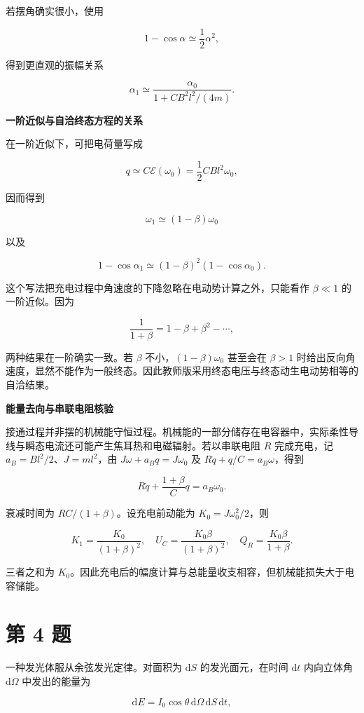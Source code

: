 \documentclass[12pt,a4paper,UTF8]{ctexart}
\begin{document}
若摆角确实很小，使用

\[1-\cos\alpha\simeq\frac12\alpha^2,\]

得到更直观的振幅关系

\[
\boxed{
\alpha_1\simeq
\frac{\alpha_0}{1+CB^2l^2/(4m)}
}.
\]

\textbf{一阶近似与自洽终态方程的关系}

在一阶近似下，可把电荷量写成

\[q\simeq C\mathcal E(\omega_0)
=\frac12CBl^2\omega_0,\]

因而得到

\[\omega_1\simeq(1-\beta)\omega_0\]

以及

\[1-\cos\alpha_1\simeq(1-\beta)^2(1-\cos\alpha_0).\]

这个写法把充电过程中角速度的下降忽略在电动势计算之外，只能看作
\(\beta\ll1\) 的一阶近似。因为

\[
\frac1{1+\beta}=1-\beta+\beta^2-\cdots,
\]

两种结果在一阶确实一致。若 \(\beta\) 不小，\((1-\beta)\omega_0\)
甚至会在 \(\beta>1\)
时给出反向角速度，显然不能作为一般终态。因此教师版采用终态电压与终态动生电动势相等的自洽结果。

\textbf{能量去向与串联电阻核验}

接通过程并非摆的机械能守恒过程。机械能的一部分储存在电容器中，实际柔性导线与瞬态电流还可能产生焦耳热和电磁辐射。若以串联电阻
\(R\) 完成充电，记 \(a_B=Bl^2/2\)、\(J=ml^2\)，由
\(J\omega+a_Bq=J\omega_0\) 及 \(R\dot q+q/C=a_B\omega\)，得到

\[R\dot q+\frac{1+\beta}{C}q=a_B\omega_0.\]

衰减时间为 \(RC/(1+\beta)\)。设充电前动能为 \(K_0=J\omega_0^2/2\)，则

\[K_1=\frac{K_0}{(1+\beta)^2},\quad
U_C=\frac{K_0\beta}{(1+\beta)^2},\quad
Q_R=\frac{K_0\beta}{1+\beta}.\]

三者之和为
\(K_0\)。因此充电后的幅度计算与总能量收支相容，但机械能损失大于电容储能。

\newpage

\section{第 4 题}\label{ux7b2c-4-ux9898}

一种发光体服从余弦发光定律。对面积为 \(\mathrm{d}S\) 的发光面元，在时间
\(\mathrm{d}t\) 内向立体角 \(\mathrm{d}\Omega\) 中发出的能量为

\[
\mathrm{d}E=I_0\cos\theta\,\mathrm{d}\Omega\,\mathrm{d}S\,\mathrm{d}t,
\]
\end{document}
